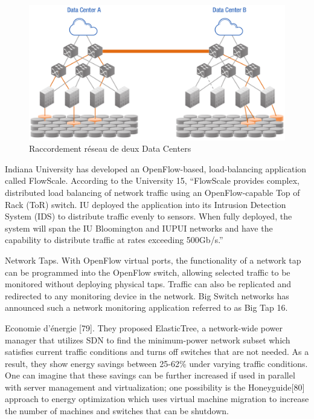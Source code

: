 \begin{figure}[!h] %
\includegraphics[width=15cm]{images/DataCenterL2Bridging.png} %
\caption{ Raccordement réseau de deux Data Centers \cite{ODCAusageScenarios}} %
\label{imgDCL2B} %
\end{figure} %


Indiana University has developed an OpenFlow-based, load-balancing application called FlowScale. According to the University 15, “FlowScale provides complex, distributed load balancing of network traffic using an OpenFlow-capable Top of Rack (ToR) switch. IU deployed the application into its Intrusion Detection System (IDS) to distribute traffic evenly to sensors. When fully deployed, the system will span the IU Bloomington and IUPUI networks and have the capability to distribute traffic at rates exceeding 500Gb/s.”


Network Taps. With OpenFlow virtual ports, the functionality of a network tap can be programmed into the OpenFlow switch, allowing selected traffic to be monitored without deploying physical taps. Traffic can also be replicated and redirected to any monitoring device in the network. Big Switch networks has announced such a network monitoring application referred to as Big Tap 16.

Economie d'énergie [79]. They proposed ElasticTree, a network-wide power manager that utilizes SDN to find the minimum-power network subset which satisfies current traffic conditions and turns off switches that are not needed. As a result, they show energy savings between 25-62\% under varying traffic conditions. One can imagine that these savings can be further increased if used in parallel with server management and virtualization; one possibility is the Honeyguide[80] approach to energy optimization which uses virtual machine migration to increase the number of machines and switches that can be shutdown.


